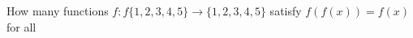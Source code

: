 How many functions $f : f\{1, 2, 3, 4, 5\}\longrightarrow\{1, 2, 3, 4, 5\}$ satisfy $f(f(x)) = f(x)$ for all 